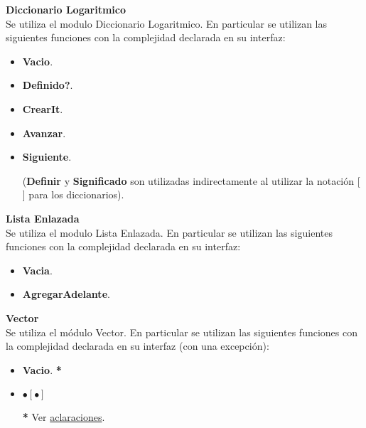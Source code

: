 \documentclass[../main.tex]{subfiles}
\begin{document}
\begin{servicios}
{\large\bfseries Diccionario Logaritmico}\\
Se utiliza el modulo Diccionario Logaritmico. En particular se utilizan las siguientes funciones con la complejidad declarada en su interfaz:\par
\begin{itemize}
        \item \textbf{Vacio}.
        \item \textbf{Definido?}.
        \item \textbf{CrearIt}.
        \item \textbf{Avanzar}.
        \item \textbf{Siguiente}.

        (\textbf{Definir} y \textbf{Significado} son utilizadas indirectamente al utilizar la notación [ ] para los diccionarios).
\end{itemize}

{\large\bfseries Lista Enlazada}\\
Se utiliza el modulo Lista Enlazada. En particular se utilizan las siguientes funciones con la complejidad declarada en su interfaz:\par
\begin{itemize}
    \item \textbf{Vacia}.
    \item \textbf{AgregarAdelante}.
\end{itemize}

{\large\bfseries Vector}\\
Se utiliza el módulo Vector. En particular se utilizan las siguientes funciones con la complejidad declarada en su interfaz (con una excepción):\par
\begin{itemize}
    \item \textbf{Vacio}. \textbf{*}
    \item  $\bullet [ \bullet ]$

    \textbf{*} Ver \hyperref[aclaracionVacio]{aclaraciones}.
\end{itemize}

\end{servicios}
\end{document}
